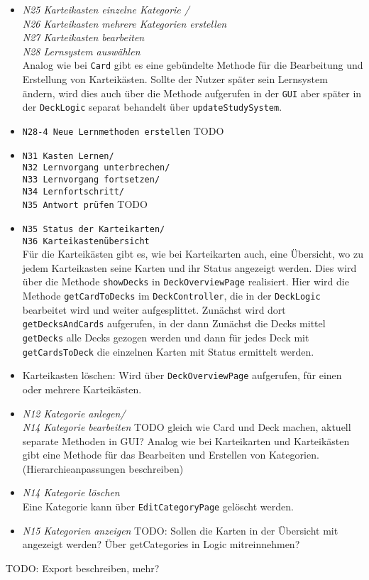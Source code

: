 \documentclass[fontsize=12pt,paper=A4,twoside]{scrartcl}
\begin{document}
    \begin{itemize}
    \item\textit{N25 Karteikasten einzelne Kategorie / \\
    N26 Karteikasten mehrere Kategorien erstellen\\
    N27 Karteikasten bearbeiten\\
    N28 Lernsystem auswählen}\\
    Analog wie bei \texttt{Card} gibt es eine gebündelte Methode für die Bearbeitung und Erstellung von Karteikästen.
    Sollte der Nutzer später sein Lernsystem ändern, wird dies auch über die Methode aufgerufen in der \texttt{GUI} aber später in der \texttt{DeckLogic}
    separat behandelt über \texttt{updateStudySystem}.
    \item \texttt{N28-4 Neue Lernmethoden erstellen} TODO
    \item \texttt{N31 Kasten Lernen/ \\N32 Lernvorgang unterbrechen/ \\N33 Lernvorgang fortsetzen/ \\N34 Lernfortschritt/ \\N35 Antwort prüfen} TODO
    \item \texttt{N35 Status der Karteikarten/ \\ N36 Karteikastenübersicht}\\
    Für die Karteikästen gibt es, wie bei Karteikarten auch, eine Übersicht, wo zu jedem Karteikasten seine Karten und ihr Status angezeigt werden.
    Dies wird über die Methode \texttt{showDecks} in \texttt{DeckOverviewPage} realisiert. Hier wird die Methode \texttt{getCardToDecks} im \texttt{DeckController},
    die in der \texttt{DeckLogic} bearbeitet wird und weiter aufgesplittet. Zunächst wird dort \texttt{getDecksAndCards} aufgerufen, in der dann Zunächst
    die Decks mittel \texttt{getDecks} alle Decks gezogen werden und dann für jedes Deck mit \texttt{getCardsToDeck} die einzelnen Karten mit Status
    ermittelt werden.
    \item Karteikasten löschen: Wird über \texttt{DeckOverviewPage} aufgerufen, für einen oder mehrere Karteikästen.
    \end{itemize}
    \begin{itemize}
        \item \textit{N12 Kategorie anlegen/ \\ N14 Kategorie bearbeiten} TODO gleich wie Card und Deck machen, aktuell separate Methoden in GUI?
    Analog wie bei Karteikarten und Karteikästen gibt eine Methode für das Bearbeiten und Erstellen von Kategorien. (Hierarchieanpassungen beschreiben)
        \item \textit{N14 Kategorie löschen}\\
    Eine Kategorie kann über \texttt{EditCategoryPage} gelöscht werden.
    \item \textit{N15 Kategorien anzeigen} TODO: Sollen die Karten in der Übersicht mit angezeigt werden? Über getCategories in Logic mitreinnehmen?\\
    \end{itemize}
    TODO: Export beschreiben, mehr?
    
\end{document}
